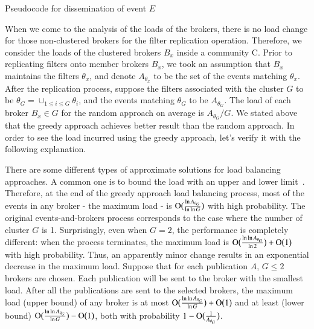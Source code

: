\begin{algorithm}
\caption{Pseudocode for dissemination of event $E$}
\label{alg:chap5_alg01}
\end{algorithm}

When we come to the analysis of the loads of the brokers, there is no load change for those non-clustered brokers for the filter replication operation. Therefore, we consider the loads of the clustered brokers $B_x$ inside a community C. Prior to replicating filters onto member brokers $B_x$, we took an assumption that $B_x$ maintains the filters $\theta_x$, and denote $A_{\theta_x}$ to be the set of the events matching $\theta_x$. After the replication process, suppose the filters associated with the cluster $G$ to be $\theta_G = \cup_{1 \leq i \leq G}\theta_i$, and the events matching $\theta_G$ to be $A_{\theta_G}$. The load of each broker $B_x \in G$ for the random approach on average is $A_{\theta_G}/G$. We stated above that the greedy approach achieves better result than the random approach. In order to see the load incurred using the greedy approach, let's verify it with the following explanation.

There are some different types of approximate solutions for load balancing approaches. A common one is to bound the load with an upper and lower limit~\cite{SSHTse2012}. Therefore, at the end of the greedy approach load balancing process, most of the events in any broker - the maximum load - is $\operatorname{O}\bigl(\frac{\ln A_{\theta_G}}{\ln\ln G}\bigr)$ with high probability. The original events-and-brokers process corresponds to the case where the number of cluster $G$ is 1. Surprisingly, even when $G=2$, the performance is completely different: when the process terminates, the maximum load is $\operatorname{O}\bigl(\frac{\ln\ln A_{\theta_G}}{\ln 2}\bigr)+\operatorname{O}\bigl(1\bigr)$ with high probability. Thus, an apparently minor change results in an exponential decrease in the maximum load. Suppose that for each publication $A$, $G \leq 2$ brokers are chosen. Each publication will be sent to the broker with the smallest load. After all the publications are sent to the selected brokers, the maximum load (upper bound) of any broker is at most $\operatorname{O}\bigl(\frac{\ln\ln A_{\theta_G}}{\ln G}\bigr) + \operatorname{O}\bigl(1\bigr)$ and at least (lower bound) $\operatorname{O}\bigl(\frac{\ln\ln A_{\theta_G}}{\ln G}\bigr) - \operatorname{O}\bigl(1\bigr)$, both with probability $1-\operatorname{O}\bigl(\frac{1}{A_{\theta_G}}\bigr)$.


